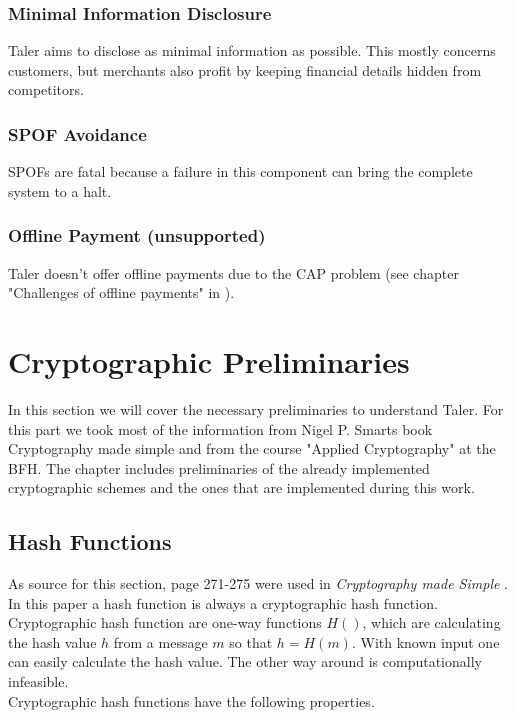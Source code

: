 \subsubsection{Minimal Information Disclosure}
\acl{Taler} aims to disclose as minimal information as possible.
This mostly concerns customers, but merchants also profit by keeping financial details hidden from competitors.

\subsubsection{\acl{SPOF} Avoidance}
\ac{SPOF}s are fatal because a failure in this component can bring the complete system to a halt.

\subsubsection{Offline Payment (unsupported)}
\acl{Taler} doesn't offer offline payments due to the CAP problem (see chapter "Challenges of offline payments" in \cite{grothoff-dold:euro-bearer-online}).


\section{Cryptographic Preliminaries}
\label{sec:crypto-preliminaries}
In this section we will cover the necessary preliminaries to understand Taler.
For this part we took most of the information from Nigel P. Smarts book Cryptography made simple \cite{modernCrypto} and from the course "Applied Cryptography" at the BFH.
The chapter includes preliminaries of the already implemented cryptographic schemes and the ones that are implemented during this work.

\subsection{Hash Functions}
As source for this section, page 271-275 were used in \textit{Cryptography made Simple}  \cite{modernCrypto}.
\label{sec:hashfunc}
In this paper a hash function is always a cryptographic hash function.
Cryptographic hash function are one-way functions $H()$, which are calculating the hash value $h$ from a message $m$ so that $ h = H(m)$.
With known input one can easily calculate the hash value.
The other way around is computationally infeasible.
\\ Cryptographic hash functions have the following properties.

